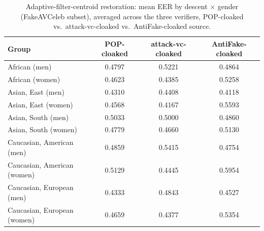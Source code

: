 \documentclass[11pt]{article}
\begin{document}
\begin{table}[H]
\centering
\caption{Adaptive-filter-centroid restoration: mean EER by descent
$\times$ gender (FakeAVCeleb subset), averaged across the three
verifiers, POP-cloaked vs.\ attack-vc-cloaked vs.\ AntiFake-cloaked
source.}
\label{tab:restoration-adaptive-demographics}
\begin{tabular}{lccc}
\toprule
Group & POP-cloaked & attack-vc-cloaked & AntiFake-cloaked \\
\midrule
African (men)               & 0.4797 & 0.5221 & 0.4864 \\
African (women)              & 0.4623 & 0.4385 & 0.5258 \\
Asian, East (men)            & 0.4310 & 0.4408 & 0.4118 \\
Asian, East (women)          & 0.4568 & 0.4167 & 0.5593 \\
Asian, South (men)           & 0.5033 & 0.5000 & 0.4860 \\
Asian, South (women)         & 0.4779 & 0.4660 & 0.5130 \\
Caucasian, American (men)    & 0.4859 & 0.5415 & 0.4754 \\
Caucasian, American (women)  & 0.5129 & 0.4445 & 0.5954 \\
Caucasian, European (men)    & 0.4333 & 0.4843 & 0.4527 \\
Caucasian, European (women)  & 0.4659 & 0.4377 & 0.5354 \\
\bottomrule
\end{tabular}
\end{table}
\end{document}
